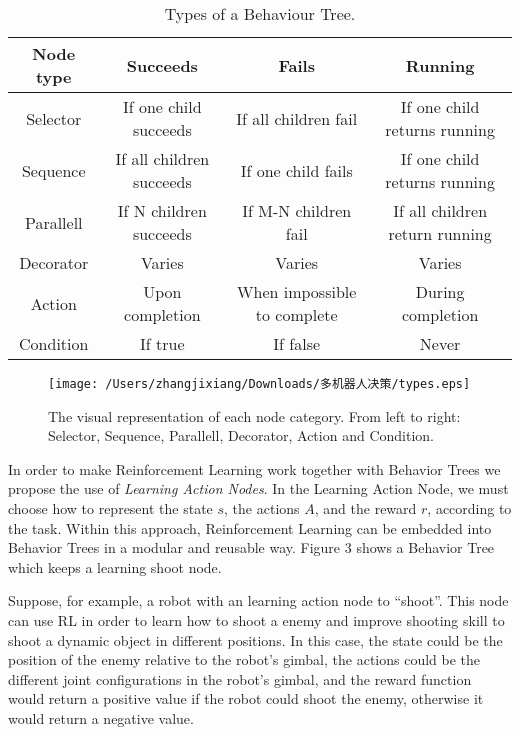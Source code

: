 \documentclass[a4paper,12pt]{article}
\begin{document}
\begin{table}[tbph!]
\caption{Types of a Behaviour Tree.}
\centering
\begin{tabular}{|c|c|c|c|}
	\hline 
	\textbf{Node type}& \textbf{Succeeds} & \textbf{Fails} & \textbf{Running} \\ 
	\hline 
	\hline
	Selector& If one child succeeds & If all children fail & If one child returns running \\ 
	\hline 
	Sequence& If all children succeeds & If one child fails & If one child returns running \\ 
	\hline 
	Parallell & If N children succeeds & If M-N children fail & If all children return running \\ 
	\hline 
	Decorator& Varies & Varies & Varies \\ 
	\hline 
	\hline
	Action& Upon completion & When impossible to complete & During completion \\ 
	\hline 
	Condition& If true & If false & Never \\ 
	\hline 
\end{tabular} 
\end{table}


\begin{figure}[tbph!]
	\centering
	\texttt{[image: /Users/zhangjixiang/Downloads/多机器人决策/types.eps]}
	\caption{The visual representation of each node category. From left to right: Selector, Sequence, Parallell, Decorator, Action and Condition.}
	\label{fig:types}
\end{figure}


In order to make Reinforcement Learning work together with Behavior Trees we propose the use of \textit{Learning Action Nodes}. In the Learning Action Node, we must choose how to represent the state $s$, the actions $A$, and the reward $r$, according to the task. Within this approach, Reinforcement Learning can be embedded into Behavior Trees in a modular and reusable way. Figure 3 shows a Behavior Tree which keeps a learning shoot node.

Suppose, for example, a robot with an learning action node to “shoot”. This node can use RL in order to learn how to shoot a enemy and improve shooting skill to shoot a dynamic object in different positions. In this case, the state could be the position of the enemy relative to the robot’s gimbal, the actions could be the different joint configurations in the robot’s gimbal, and the reward function would return a positive value if the robot could shoot the enemy, otherwise it would return a negative value.
\end{document}
